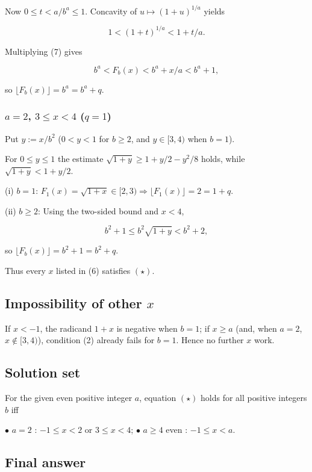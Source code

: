 \documentclass[12pt,a4paper]{article}
\theoremstyle{definition}
\begin{document}
        Now $0\leq t<a/b^{a}\leq 1$. Concavity of $u\mapsto(1+u)^{1/a}$ yields

        $$1 < (1+t)^{1/a} < 1+t/a.$$

        Multiplying (7) gives

        $$b^{a} < F_b(x) < b^{a}+x/a < b^{a}+1,$$

        so $\lfloor F_b(x)\rfloor=b^{a}=b^{a}+q$.

        \subsubsection*{$a=2$, $3 \leq x < 4$ ($q = 1$)}

        Put $y:=x/b^{2}$ ($0<y<1$ for $b\geq 2$, and $y\in[3,4)$ when $b=1$).

        For $0\leq y\leq 1$ the estimate
        $\sqrt{1+y} \geq 1+y/2-y^{2}/8$ holds, while $\sqrt{1+y} < 1+y/2$.

        (i) $b=1$: $F_1(x)=\sqrt{1+x}\in[2,3) \Rightarrow \lfloor F_1(x)\rfloor=2=1+q$.

        (ii) $b\geq 2$: Using the two-sided bound and $x<4$,

        $$b^{2}+1 \leq b^{2}\sqrt{1+y} < b^{2}+2,$$

        so $\lfloor F_b(x)\rfloor=b^{2}+1=b^{2}+q$.

        Thus every $x$ listed in (6) satisfies $(\star)$.

        \subsection*{Impossibility of other $x$}

        If $x<-1$, the radicand $1+x$ is negative when $b=1$; if $x\geq a$ (and, when $a=2$, $x\notin[3,4)$), condition (2) already fails for $b=1$. Hence no further $x$ work.

        \subsection*{Solution set}

        For the given even positive integer $a$, equation $(\star)$ holds for all
        positive integers $b$ iff

        $\bullet$ $a = 2$ : $-1 \leq x < 2$ or $3 \leq x < 4$;
        $\bullet$ $a \geq 4$ even : $-1 \leq x < a$.

        \subsection*{Final answer}
\end{document}

